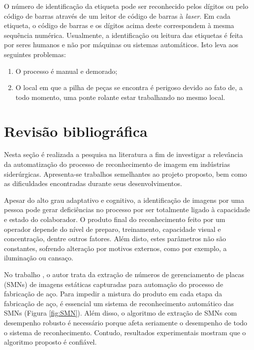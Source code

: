 O número de identificação da etiqueta pode ser reconhecido pelos dígitos ou pelo código de barras através de um leitor de código de barras à \textit{laser}. Em cada etiqueta, o código de barras e os dígitos acima deste correspondem à mesma sequência numérica. Usualmente, a identificação ou leitura das etiquetas é feita por seres humanos e não por máquinas ou sistemas automáticos. Isto leva aos seguintes problemas:

\begin{enumerate}
	\item O processo é manual e demorado;
	\item O local em que a pilha de peças se encontra é perigoso devido ao fato de, a todo momento, uma ponte rolante estar trabalhando no mesmo local.
\end{enumerate}

\section{Revisão bibliográfica} 

Nesta seção é realizada a pesquisa na literatura a fim de investigar a relevância da automatização do processo de reconhecimento de imagem em indústrias siderúrgicas. Apresenta-se trabalhos semelhantes ao projeto proposto, bem como as dificuldades encontradas durante seus desenvolvimentos. 

Apesar do alto grau adaptativo e cognitivo, a identificação de imagens por uma pessoa pode gerar deficiências no processo por ser totalmente ligado à capacidade e estado do colaborador. O produto final do reconhecimento feito por um operador depende do nível de preparo, treinamento, capacidade visual e concentração, dentre outros fatores. \cite{refbib1} 
%
Além disto, estes parâmetros não são constantes, sofrendo alteração por motivos externos, como por exemplo, a iluminação ou cansaço. \cite{refbib2, refbib3}

No trabalho \citeauthor{ref1}, o autor trata da extração de números de gerenciamento de placas (SMNs) de imagens estáticas capturadas para automação do processo de fabricação de aço. Para impedir a mistura do produto em cada etapa da fabricação de aço, é essencial um sistema de reconhecimento automático das SMNs (Figura \ref{fig:SMN}). Além disso, o algoritmo de extração de SMNs com desempenho robusto é necessário porque afeta seriamente o desempenho de todo o sistema de reconhecimento. Contudo, resultados experimentais mostram que o algoritmo proposto é confiável. 

